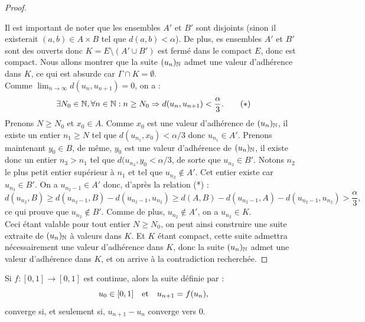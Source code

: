 \begin{proof}
\begin{center}
\end{center}
Il est important de noter que les ensembles $A'$ et $B'$ sont disjoints (sinon il existerait $(a,b) \in A \times B$ tel que $d(a,b) < \alpha$).
De plus, es ensembles $A'$ et $B'$ sont des ouverts donc $K = E \setminus (A' \cup B')$ est fermé dans le compact $E$, 
donc est compact.
Nous allons montrer que la suite $(u_n)_{\mathbb{N}}$ admet une valeur d'adhérence dans $K$, 
ce qui est absurde car $\Gamma \cap K = \emptyset$. \\
Comme $\lim_{n \to \infty} d(u_n,u_{n+1}) = 0$, on a :
\[ \exists N_0 \in \mathbb{N}, \forall n \in \mathbb{N} : n \geq N_0 \Rightarrow d(u_n, u_{n+1}) < \dfrac{\alpha}3 . \qquad (*) \]
Prenons $N \geq N_0$ et $x_0 \in A$. Comme $x_0$ est une valeur d'adhérence de $(u_n)_{\mathbb{N}}$, il existe un entier $n_1 \geq N$ tel que 
$d(u_{n_1}, x_0) < \alpha /3$ donc $u_{n_1} \in A'$. 
Prenons maintenant $y_0 \in B$, de même, $y_0$ est une valeur d'adhérence de $(u_n)_{\mathbb{N}}$, il existe donc un entier $n_3 > n_1$ 
tel que $d(u_{n_3}, y_0 < \alpha/3$, de sorte que $u_{n_3} \in B'$.
Notons $n_2$ le plus petit entier supérieur à $n_1$ et tel que $u_{n_2} \not \in A'$. Cet entier existe car $u_{n_3} \in B'$. 
On a $u_{n_2-1} \in A'$ donc, d'après la relation (*) :
\[ d(u_{n_2}, B) \geq d(u_{n_2-1}, B) - d(u_{n_2-1}, u_{n_2}) \geq d(A,B) - d(u_{n_2-1}, A) - d(u_{n_2-1}, u_{n_2}) > \dfrac{\alpha}3 , \]
ce qui prouve que $u_{n_2} \not \in B'$. Comme de plus,  $u_{n_2} \not \in A'$, on a  $u_{n_2} \in K$. \\
Ceci étant valable pour tout entier $N \geq N_0$, on peut ainsi construire une suite extraite de $(u_n)_{\mathbb{N}}$ à valeurs dans $K$.
Et $K$ étant compact, cette suite admettra nécessairement une valeur d'adhérence dans $K$, donc la suite $(u_n)_{\mathbb{N}}$ admet une 
valeur d'adhérence dans $K$, et on arrive à la contradiction recherchée.
\end{proof}

\begin{appl}
Si $f : [0,1] \to [0,1]$ est continue, alors la suite définie par :
\[ u_0 \in [0,1] \quad \text{et} \quad u_{n+1} = f(u_n) , \]
converge si, et seulement si, $u_{n+1}-u_n$ converge vers 0.
\end{appl}

